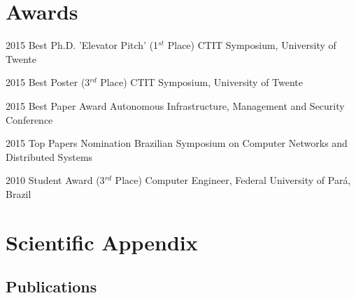 \documentclass[]{friggeri-cv} %
\begin{document}
\section{Awards}

\begin{entrylist}
\vspace{-0.3cm}
\entry
{2015}
{Best Ph.D. 'Elevator Pitch' (1$^{st}$ Place)}
{CTIT Symposium, University of Twente}

\vspace{-0.3cm}
\entry
{2015}
{Best Poster (3$^{rd}$ Place)}
{CTIT Symposium, University of Twente}

\vspace{-0.3cm}
\entry
{2015}
{Best Paper Award}
{Autonomous Infrastructure, Management and Security Conference}

\vspace{-0.3cm}
\entry
{2015}
{Top Papers Nomination}
{Brazilian Symposium on Computer Networks and Distributed Systems}

\vspace{-0.3cm}
\entry
{2010}
{Student Award (3$^{rd}$ Place)}
{Computer Engineer, Federal University of Pará, Brazil}

\end{entrylist}


\let\thefootnote\relax{}

\newpage
\section{Scientific Appendix}

\subsection{Publications}
\nocite{*}
\printbibliography[title={\emptyset}]
\end{document}
